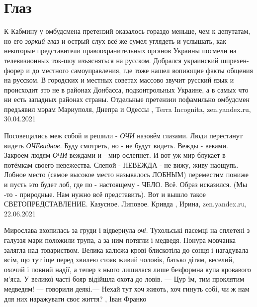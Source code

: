  
 
 
 
 
\chapter{Глаз}
\label{sec:slova.glaz}

К Кабмину у омбудсмена претензий оказалось гораздо меньше, чем к депутатам, но
его \emph{зоркий глаз} и острый слух всё же сумел углядеть и услышать, как некоторые
представители правоохранительных органов Украины посмели на телевизионных
ток-шоу изъясняться на русском.  Добрался украинский шпрехен-фюрер и до
местного самоуправления, где тоже нашел вопиющие факты общения на русском. В
городских и местных советах массово звучит русский язык и происходит это не в
районах Донбасса, подконтрольных Украине, а в самых что ни есть западных
районах страны. Отдельные претензии пофамильно омбудсмен предъявил мэрам
Мариуполя, Днепра и Одессы
, 
Terra Incognita, zen.yandex.ru, 30.04.2021

Посовещались меж собой и решили - \emph{ОЧИ} назовём глазами. Люди перестанут видеть
\emph{ОЧЕвидное}. Буду смотреть, но - не будут видеть. Вежды - веками. Закроем людям
\emph{ОЧИ} веждами и - мир ослепнет. И вот уж мир блукает в потёмкам своего
невежества. Слепой - НЕВЕЖДА - не вижу, живу наощупь.  Лобное место (самое
высокое место называлось ЛОБНЫМ) переместим пониже и пусть это будет лоб, где
по - настоящему - ЧЕЛО. Всё. Образ исказился.  (Мы -то - природные. Нам нужно
всё представить). Вот и вышло такое СВЕТОПРЕДСТАВЛЕНИЕ. Казусное. Липовое.
Кривда 
, 
Ирина, zen.yandex.ru, 22.06.2021

Мирослава вхопилась за груди і відвернула \emph{очі}. Тухольські пасемці на сплетені з
галуззя мари положили трупа, а за ним потягли і медведя. Понура мовчанка
залягла над товариством. Велика калюжа крові блискотіла до сонця і нагадувала
всім, що тут іще перед хвилею стояв живий чоловік, батько дітям, веселий,
охочий і повний надії, а тепер з нього лишилася лише безформна купа кровавого
м'яса. У великої часті бояр відійшла охота до ловів.  — Цур їм, тим проклятим
медведям! — говорили деякі.— Нехай тут хоч жиють, хоч гинуть собі, чи ж нам для
них наражувати своє життя?
, Іван Франко

